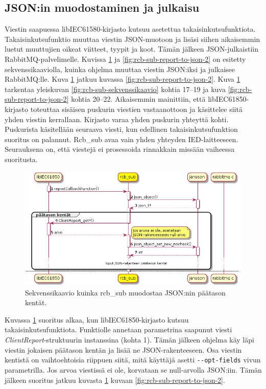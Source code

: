 \subsection{JSON:in muodostaminen ja julkaisu}
Viestin saapuessa libIEC61580-kirjasto kutsuu asetettua takaisinkutsufunktiota. Takaisinkutsufunktio muuttaa viestin JSON-muotoon ja lisäsi siihen aikaisemmin luetut muuttujien oikeat viitteet, tyypit ja koot. Tämän jälkeen JSON-julkaistiin RabbitMQ-palvelimelle. Kuvissa \ref{fig:rcb-sub-report-to-json-1} ja \ref{fig:rcb-sub-report-to-json-2} on esitetty sekvenssikaaviolla, kuinka ohjelma muuttaa viestin JSON:iksi ja julkaisee RabbitMQ:lle. Kuva \ref{fig:rcb-sub-report-to-json-1} jatkuu kuvassa \ref{fig:rcb-sub-report-to-json-2}. Kuva \ref{fig:rcb-sub-report-to-json-1} tarkentaa yleiskuvan \ref{fig:rcb-sub-sekvenssikaavio} kohtia 17--19 ja kuva \ref{fig:rcb-sub-report-to-json-2} kohtia 20--22. Aikaisemmin mainittiin, että libIEC61850-kirjasto toteuttaa sisäisen puskurin viestien vastaanottoon ja käsittelee siitä yhden viestin kerrallaan. Kirjasto varaa yhden puskurin yhteyttä kohti. Puskurista käsitellään seuraava viesti, kun edellinen takaisinkutsufunktion suoritus on palannut. Rcb\_sub avaa vain yhden yhteyden IED-laitteeseen. Seurauksena on, että viestejä ei prosessoida rinnakkain missään vaiheessa suoritusta.

\begin{figure}[ht!]
	\includegraphics[width=1\textwidth]{pictures/rcb-sub-report-to-json.png}
	\caption{Sekvenssikaavio kuinka rcb\_sub muodostaa JSON:nin päätason kentät.}
	\label{fig:rcb-sub-report-to-json-1}
\end{figure}

Kuvassa \ref{fig:rcb-sub-report-to-json-1} suoritus alkaa, kun libIEC61850-kirjasto kutsuu takaisinkutsufunktiota. Funktiolle annetaan parametrina saapunut viesti \emph{ClientReport}-struktuurin instanssina (kohta 1). Tämän jälkeen ohjelma käy läpi viestin jokaisen päätason kentän ja lisää ne JSON-rakenteeseen. Osa viestin kentistä on vaihtoehtoisia riippuen siitä, mitä käyttäjä asetti \texttt{-{}-opt-fields} vivun parametrilla. Jos arvoa viestissä ei ole, korvataan se null-arvolla JSON:iin. Tämän jälkeen suoritus jatkuu kuvasta \ref{fig:rcb-sub-report-to-json-1} kuvaan \ref{fig:rcb-sub-report-to-json-2}.

